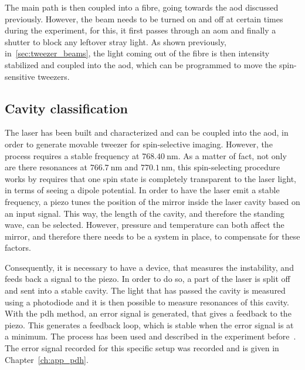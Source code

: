 The main path is then coupled into a fibre, going towards the \ac{aod} discussed previously. However, the beam needs to be turned on and off at certain times during the experiment, for this, it first passes through an \ac{aom} and finally a shutter to block any leftover stray light. As shown previously, in~\ref{sec:tweezer_beams}, the light coming out of the fibre is then intensity stabilized and coupled into the \ac{aod}, which can be programmed to move the spin-sensitive tweezers.

\subsection{Cavity classification}

The laser has been built and characterized and can be coupled into the \ac{aod}, in order to generate movable tweezer for spin-selective imaging. However, the process requires a stable frequency at $\SI{768.40}{\nano\meter}$. As a matter of fact, not only are there resonances at $\SI{766.7}{\nano\meter}$ and $\SI{770.1}{\nano\meter}$, this spin-selecting procedure works by requires that one spin state is completely transparent to the laser light, in terms of seeing a dipole potential. In order to have the laser emit a stable frequency, a piezo tunes the position of the mirror inside the laser cavity based on an input signal. This way, the length of the cavity, and therefore the standing wave, can be selected. However, pressure and temperature can both affect the mirror, and therefore there needs to be a system in place, to compensate for these factors.

Consequently, it is necessary to have a device, that measures the instability, and feeds back a signal to the piezo. In order to do so, a part of the laser is split off and sent into a stable cavity. The light that has passed the cavity is measured using a photodiode and it is then possible to measure resonances of this cavity. With the \ac{pdh} method, an error signal is generated, that gives a feedback to the piezo. This generates a feedback loop, which is stable when the error signal is at a minimum. The process has been used and described in the experiment before~\cite{Hirthe2018}. The error signal recorded for this specific setup was recorded and is given in Chapter~\ref{ch:app_pdh}.

